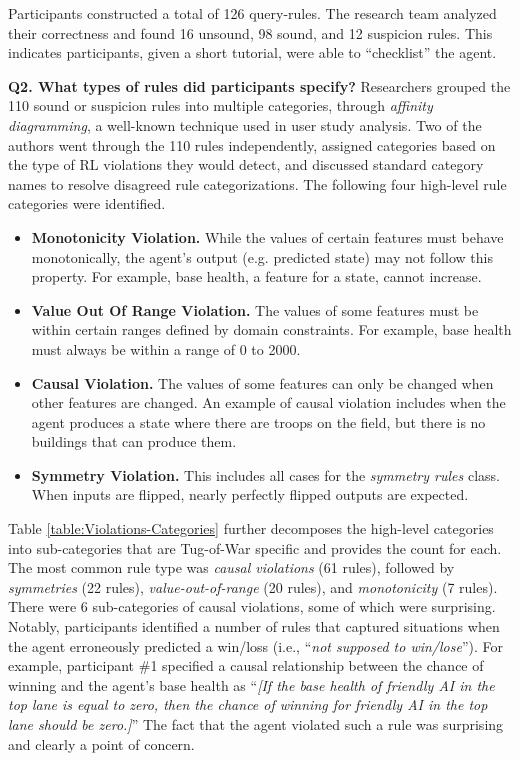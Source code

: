 \documentclass[letterpaper]{article} %
\begin{document}
Participants constructed a total of 126 query-rules. The research team analyzed their correctness and found 16 unsound, 98 sound, and 12 suspicion rules. This indicates participants, given a short tutorial, were able to ``checklist'' the agent.

\textbf{Q2. What types of rules did participants specify?}
Researchers grouped the 110 sound or suspicion rules into multiple categories, through \textit{affinity diagramming}, a well-known technique used in user study analysis.
Two of the authors went through the 110 rules independently, assigned categories based on the type of RL violations they would detect,  
and discussed standard category names to resolve disagreed rule categorizations. 
The following four high-level rule categories were identified. 
\begin{itemize}[itemsep=0pt,topsep=1pt]
  \item \textbf{Monotonicity Violation.}
  While the values of certain features must behave monotonically, the agent's output (e.g. predicted state) may not follow this property.
  For example, base health, a feature for a state, cannot increase.

  
  \item \textbf{Value Out Of Range Violation.}
  The values of some features must be within certain ranges defined by domain constraints.
  For example, base health must always be within a range of 0 to 2000.
  

  \item \textbf{Causal Violation.}
  The values of some features can only be changed when other features are changed.
  An example of causal violation includes when the agent produces a state where there are troops on the field, but there is no buildings that can produce them. 


  \item \textbf{Symmetry Violation.}
  This includes all cases for the \textit{symmetry rules} class.
  When inputs are flipped, nearly perfectly flipped outputs are expected.

  
\end{itemize}
Table \ref{table:Violations-Categories} further decomposes the high-level categories into sub-categories that are Tug-of-War specific and provides the count for each. The most common rule type was \textit{causal violations} (61 rules), followed by \textit{symmetries} (22 rules), \textit{value-out-of-range} (20 rules), and \textit{monotonicity} (7 rules).
There were 6 sub-categories of causal violations, some of which were surprising. 
Notably, participants identified a number of rules that captured  
situations when the agent erroneously predicted a win/loss (i.e., ``\textit{not supposed to win/lose}'').
For example, participant \#1 specified a causal relationship between the chance of winning and the agent's base health as ``\textit{[If the base health of friendly AI in the top lane is equal to zero, then the chance of winning for friendly AI in the top lane should be zero.]}'' The fact that the agent violated such a rule was surprising and clearly a point of concern. 
\end{document}
